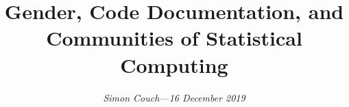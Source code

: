 \documentclass[12pt]{article}
\begin{document}
\makeatletter
\renewcommand\section{\@startsection {section}{1}{\z@}%
                                     {-1.5ex\@plus -1ex \@minus -.2ex}%
                                     {.75ex \@plus .2ex}%
                                     {\normalfont\normalsize\bfseries}}%
\renewcommand\subsection{\@startsection{subsection}{2}{\z@}%
                                     {-1.0ex\@plus -1ex \@minus -.2ex}%
                                     {.5ex \@plus .2ex}%
                                     {\normalfont\normalsize\itshape}}%
\renewcommand\subsubsection{\@startsection{subsubsection}{3}{\z@}%
                                     {0 ex\@plus -.5ex \@minus -.1ex}%
                                     {0 ex \@plus .1ex}%
                                     {\normalfont\normalsize\itshape}}%
\makeatother

\title{\vspace{-10pt} Gender, Code Documentation, and Communities of Statistical Computing}
       
\author{\textit{Simon Couch—16 December 2019}}

\date{}

\maketitle

\doublespace







\clearpage



\clearpage
\appendix

\end{document}

